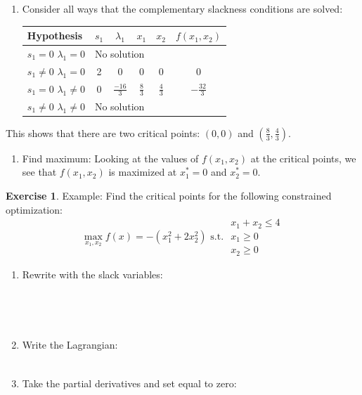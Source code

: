 \documentclass[
]{book}
\providecommand{\tightlist}{%
  \setlength{\itemsep}{0pt}\setlength{\parskip}{0pt}}
\theoremstyle{definition}
\theoremstyle{definition}
\theoremstyle{definition}
\newtheorem{exercise}{Exercise}[chapter]
\theoremstyle{remark}
\begin{document}
\begin{enumerate}
\def\labelenumi{\arabic{enumi}.}
\setcounter{enumi}{3}
\tightlist
\item
  Consider all ways that the complementary slackness conditions are solved:

  \begin{center}
  \begin{tabular}{|l|cccc|c|}
  \hline
  Hypothesis & $s_1$ & $\lambda_1$ & $x_1$ & $x_2$ & $f(x_1, x_2)$\\
  \hline
  $s_1 = 0$ $\lambda_1 = 0$ & \multicolumn{4}{l|}{No solution} & \\
  $s_1 \neq 0$ $\lambda_1 = 0$ & 2 & 0 & 0 & 0  & 0\\
  $s_1 = 0$ $\lambda_1 \neq 0$ & 0 & $\frac{-16}{3}$ & $\frac{8}{3}$ & $\frac{4}{3}$ & $-\frac{32}{3}$\\
  $s_1 \neq 0$ $\lambda_1 \neq 0$ & \multicolumn{4}{l|}{No solution} &\\
  \hline
  \end{tabular}
  \end{center}
\end{enumerate}

This shows that there are two critical points: \((0,0)\) and \((\frac{8}{3},\frac{4}{3})\).

\begin{enumerate}
\def\labelenumi{\arabic{enumi}.}
\setcounter{enumi}{4}
\tightlist
\item
  Find maximum:
  Looking at the values of \(f(x_1,x_2)\) at the critical points, we see that \(f(x_1,x_2)\) is maximized at \(x_1^* = 0\) and \(x_2^*=0\).
\end{enumerate}

\begin{exercise}
\protect\hypertarget{exr:unnamed-chunk-62}{}{\label{exr:unnamed-chunk-62} }Example: Find the critical points for the following constrained optimization:
\[\max_{x_1,x_2} f(x) = -(x_1^2 + 2x_2^2) \text{ s.t. } 
\begin{array}{l}
x_1 + x_2 \le 4\\
x_1 \ge 0\\
x_2 \ge 0
\end{array}\]
\end{exercise}

\begin{enumerate}
\def\labelenumi{\arabic{enumi}.}
\item
  Rewrite with the slack variables:
  \[\phantom{max_{x_1,x_2} f(x) = -(x_1^2 + 2x_2^2) \text{ s.t. } 
  \begin{array}{l}
  x_1 + x_2 \le 4 - s_1^2\\
  -x_1 \le 0 - s_2^2\\
  -x_2 \le 0 - s_3^2
  \end{array}}\]
\item
  Write the Lagrangian:
  \[\phantom{L(x_1, x_2, \lambda_1, \lambda_2, \lambda_3, s_1, s_2, s_3) =  -(x_1^2 + 2x_2^2) - \lambda_1(x_1 + x_2 + s_1^2  - 4) - \lambda_2(-x_1 + s_2^2) - \lambda_3(-x_2 + s_3^2)}\]
\item
  Take the partial derivatives and set equal to zero:
\end{enumerate}
\end{document}
